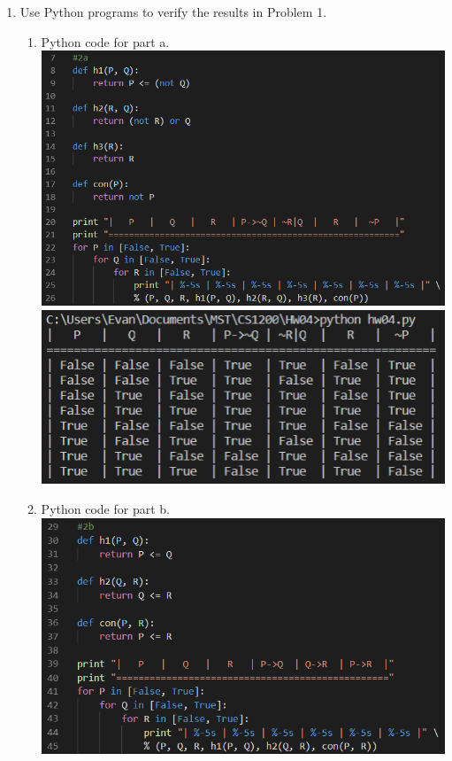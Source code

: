 \documentclass{article}
\begin{document}
\begin{enumerate}
\begin{enumerate}
    \end{enumerate}

    
    \item Use Python programs to verify the results in Problem 1.

    \begin{enumerate}
        \item Python code for part a.\\
        \includegraphics[scale=.6]{2a1}\\
        \includegraphics[scale=.7]{2a2}
        \item Python code for part b.\\
        \includegraphics[scale=.6]{2b1}\\

\end{enumerate}
\end{enumerate}
\end{document}
